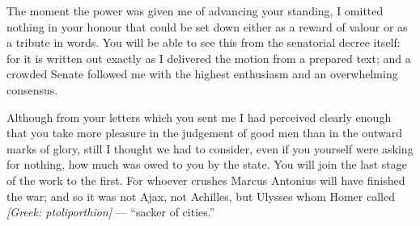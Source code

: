 

 The moment the power was given me of advancing your standing, I omitted nothing in your honour that could be set down either as a reward of valour or as a tribute in words. You will be able to see this from the senatorial decree itself: for it is written out exactly as I delivered the motion from a prepared text; and a crowded Senate followed me with the highest enthusiasm and an overwhelming consensus.

 Although from your letters which you sent me I had perceived clearly enough that you take more pleasure in the judgement of good men than in the outward marks of glory, still I thought we had to consider, even if you yourself were asking for nothing, how much was owed to you by the state. You will join the last stage of the work to the first. For whoever crushes Marcus Antonius will have finished the war; and so it was not Ajax, not Achilles, but Ulysses whom Homer called \textit{[Greek: ptoliporthion]} --- ``sacker of cities.''
